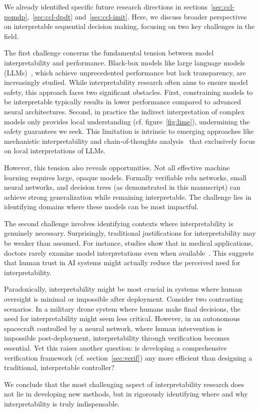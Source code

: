 We already identified specific future research directions in sections~\ref{sec:ccl-pomdp},~\ref{sec:ccl-dpdt} and~\ref{sec:ccl-imit}. Here, we discuss broader perspectives on interpretable sequential decision making, focusing on two key challenges in the field.

The first challenge concerns the fundamental tension between model interpretability and performance. Black-box models like large language models (LLMs)~\cite{all-you-need}, which achieve unprecedented performance but lack transparency, are increasingly studied. While interpretability research often aims to ensure model safety, this approach faces two significant obstacles. First, constraining models to be interpretable typically results in lower performance compared to advanced neural architectures. Second, in practice the indirect interpretation of complex models only provides local understanding (cf. figure~\ref{fig:lime}), undermining the safety guarantees we seek. This limitation is intrinsic to emerging approaches like mechanistic interpretability and chain-of-thoughts analysis~\cite{barez-chain-2025} that exclusively focus on local interpretations of LLMs.

However, this tension also reveals opportunities. Not all effective machine learning requires large, opaque models. Formally verifiable relu networks, small neural networks, and decision trees (as demonstrated in this manuscript) can achieve strong generalization while remaining interpretable. The challenge lies in identifying domains where these models can be most impactful.

The second challenge involves identifying contexts where interpretability is genuinely necessary. Surprisingly, traditional justifications for interpretability may be weaker than assumed. For instance, studies show that in medical applications, doctors rarely examine model interpretations even when available~\cite{festor}. This suggests that human trust in AI systems might actually reduce the perceived need for interpretability.

Paradoxically, interpretability might be most crucial in systems where human oversight is minimal or impossible after deployment. Consider two contrasting scenarios. In a military drone system where humans make final decisions, the need for interpretability might seem less critical. However, in an autonomous spacecraft controlled by a neural network, where human intervention is impossible post-deployment, interpretability through verification becomes essential. Yet this raises another question: is developing a comprehensive verification framework (cf. section~\ref{sec:verif}) any more efficient than designing a traditional, interpretable controller?

We conclude that the most challenging aspect of interpretability research does not lie in developing new methods, but in rigorously identifying where and why interpretability is truly indispensable.
